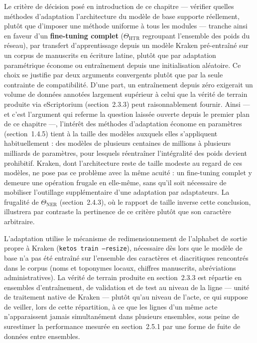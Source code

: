 Le critère de décision posé en introduction de ce chapitre --- vérifier quelles méthodes d'adaptation l'architecture du modèle de base supporte réellement, plutôt que d'imposer une méthode uniforme à tous les modules --- tranche ainsi en faveur d'un \textbf{fine-tuning complet} ($\Theta_{\mathrm{HTR}}$ regroupant l'ensemble des poids du réseau), par transfert d'apprentissage depuis un modèle Kraken pré-entraîné sur un corpus de manuscrits en écriture latine, plutôt que par adaptation paramétrique économe ou entraînement depuis une initialisation aléatoire.
Ce choix se justifie par deux arguments convergents plutôt que par la seule contrainte de compatibilité.
D'une part, un entraînement depuis zéro exigerait un volume de données annotées largement supérieur à celui que la vérité de terrain produite via eScriptorium (section~2.3.3) peut raisonnablement fournir.
Ainsi --- et c'est l'argument qui referme la question laissée ouverte depuis le premier plan de ce chapitre ---, l'intérêt des méthodes d'adaptation économe en paramètres (section~1.4.5) tient à la taille des modèles auxquels elles s'appliquent habituellement : des modèles de plusieurs centaines de millions à plusieurs milliards de paramètres, pour lesquels réentraîner l'intégralité des poids devient prohibitif.
Kraken, dont l'architecture reste de taille modeste au regard de ces modèles, ne pose pas ce problème avec la même acuité : un fine-tuning complet y demeure une opération frugale en elle-même, sans qu'il soit nécessaire de mobiliser l'outillage supplémentaire d'une adaptation par adaptateurs.
La frugalité de $\Theta_{\mathrm{NER}}$ (section~2.4.3), où le rapport de taille inverse cette conclusion, illustrera par contraste la pertinence de ce critère plutôt que son caractère arbitraire.

L'adaptation utilise le mécanisme de redimensionnement de l'alphabet de sortie propre à Kraken (\texttt{ketos train --resize}), nécessaire dès lors que le modèle de base n'a pas été entraîné sur l'ensemble des caractères et diacritiques rencontrés dans le corpus (noms et toponymes locaux, chiffres manuscrits, abréviations administratives).
La vérité de terrain produite en section~2.3.3 est répartie en ensembles d'entraînement, de validation et de test au niveau de la ligne --- unité de traitement native de Kraken --- plutôt qu'au niveau de l'acte, ce qui suppose de veiller, lors de cette répartition, à ce que les lignes d'un même acte n'apparaissent jamais simultanément dans plusieurs ensembles, sous peine de surestimer la performance mesurée en section~2.5.1 par une forme de fuite de données entre ensembles.

